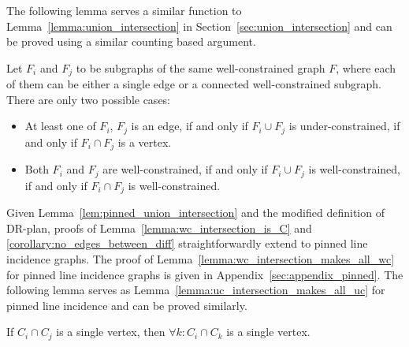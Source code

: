 The following lemma serves a similar function to Lemma~\ref{lemma:union_intersection} in Section~\ref{sec:union_intersection}
and can be proved using a similar counting based argument.


\begin{lemma}
\label{lem:pinned_union_intersection}
Let $F_i$ and $F_j$ to be subgraphs of the same well-constrained graph $F$,
where each of them can be either  a single edge or a connected well-constrained subgraph.
There are only two possible cases:
\begin{itemize}
\item At least one of $F_i$, $F_j$ is an edge, if and only if $F_i \cup F_j$ is under-constrained, if and only if $F_i \cap F_j$ is a vertex.
\item Both $F_i$ and $F_j$ are well-constrained, if and only if $F_i \cup F_j$ is well-constrained, if and only if $F_i \cap F_j$ is well-constrained.
\end{itemize}
\end{lemma}

Given Lemma~\ref{lem:pinned_union_intersection} and the modified definition of DR-plan,
proofs of Lemma~\ref{lemma:wc_intersection_is_C} and \ref{corollary:no_edges_between_diff} straightforwardly extend to  pinned line incidence graphs.
The proof of Lemma~\ref{lemma:wc_intersection_makes_all_wc} for pinned line incidence graphs 
is given in Appendix~\ref{sec:appendix_pinned}.
The following lemma serves as Lemma~\ref{lemma:uc_intersection_makes_all_uc} for pinned line incidence and can be proved similarly.
\begin{lemma}
\label{lem:vertex_intersection}
If $C_i\cap C_j$ is a single vertex, then $\forall k: C_i\cap C_k$ is a single vertex.
\end{lemma}

